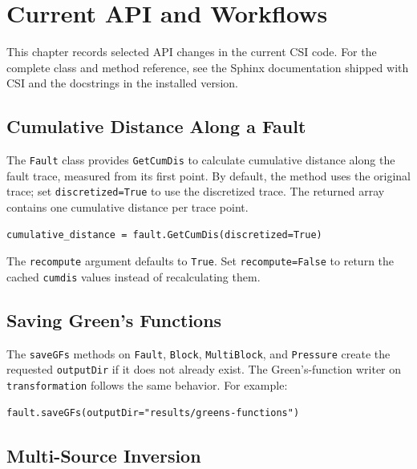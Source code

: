 \chapter{Current API and Workflows}
\label{chap:current-api}

This chapter records selected API changes in the current CSI code. For the complete class and method reference, see the Sphinx documentation shipped with CSI and the docstrings in the installed version.

\section{Cumulative Distance Along a Fault}
\label{sec:fault-cumulative-distance}

The \texttt{Fault} class provides \texttt{GetCumDis} to calculate cumulative distance along the fault trace, measured from its first point. By default, the method uses the original trace; set \texttt{discretized=True} to use the discretized trace. The returned array contains one cumulative distance per trace point.

\begin{verbatim}
cumulative_distance = fault.GetCumDis(discretized=True)
\end{verbatim}

The \texttt{recompute} argument defaults to \texttt{True}. Set \texttt{recompute=False} to return the cached \texttt{cumdis} values instead of recalculating them.

\section{Saving Green's Functions}
\label{sec:saving-greens-functions}

The \texttt{saveGFs} methods on \texttt{Fault}, \texttt{Block}, \texttt{MultiBlock}, and \texttt{Pressure} create the requested \texttt{outputDir} if it does not already exist. The Green's-function writer on \texttt{transformation} follows the same behavior. For example:

\begin{verbatim}
fault.saveGFs(outputDir="results/greens-functions")
\end{verbatim}

\section{Multi-Source Inversion}
\label{sec:multi-source-inversion}

